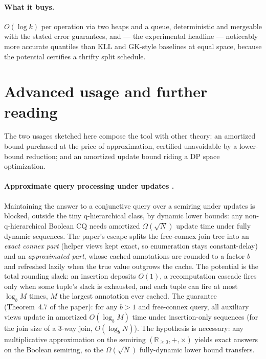 \paragraph{What it buys.}
$O(\log k)$ per operation via two heaps and a queue, deterministic and
mergeable with the stated error guarantees, and --- the experimental
headline --- noticeably more accurate quantiles than KLL and GK-style
baselines at equal space, because the potential certifies a thrifty split
schedule.

\section{Advanced usage and further reading}
\label{sec:amo-advanced}

The two usages sketched here compose the tool with other theory: an
amortized bound purchased at the price of approximation, certified
unavoidable by a lower-bound reduction; and an amortized update bound
riding a DP space optimization.

\paragraph{Approximate query processing under updates
\citep{sigmod26-274}.}
Maintaining the answer to a conjunctive query over a semiring under updates
is blocked, outside the tiny q-hierarchical class, by dynamic lower bounds:
any non-q-hierarchical Boolean CQ needs amortized $\Omega(\sqrt{N})$ update
time under fully dynamic sequences. The paper's escape splits the
free-connex join tree into an \emph{exact connex part} (helper views kept
exact, so enumeration stays constant-delay) and an \emph{approximated
part}, whose cached annotations are rounded to a factor $b$ and refreshed
lazily when the true value outgrows the cache. The potential is the total
rounding slack: an insertion deposits $O(1)$, a recomputation cascade fires
only when some tuple's slack is exhausted, and each tuple can fire at most
$\log_b M$ times, $M$ the largest annotation ever cached. The guarantee
(Theorem~4.7 of the paper): for any $b > 1$ and free-connex query, all
auxiliary views update in amortized $O(\log_b M)$ time under
insertion-only sequences (for the join size of a 3-way join, $O(\log_b
N)$). The hypothesis is necessary: any multiplicative approximation on the
semiring $(\mathbb{R}_{\ge 0}, +, \times)$ yields exact answers on the
Boolean semiring, so the $\Omega(\sqrt{N})$ fully-dynamic lower bound
transfers.

